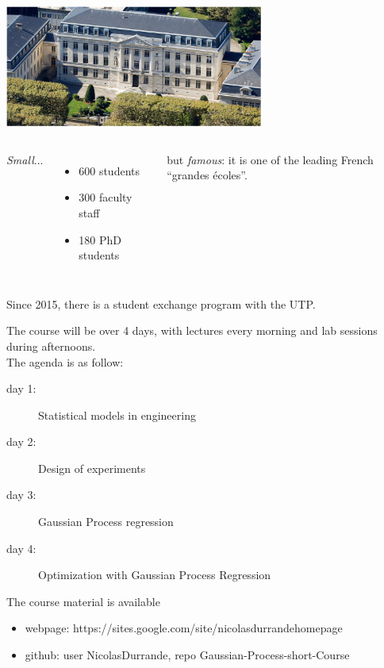 \documentclass{beamer}
\begin{document}
\begin{frame}{}
\begin{center}
\includegraphics[height=4cm]{figures/Mines}
\end{center}
\begin{columns}[t]
\column{5cm}
\emph{Small}...
\begin{itemize}
	\item 600 students
	\item 300 faculty staff
	\item 180 PhD students 
\end{itemize}
\column{5cm}
but \emph{famous}: it is one of the leading French ``grandes écoles''.\\
\end{columns}
\vspace{5mm}
Since 2015, there is a student exchange program with the UTP.
\end{frame}

\begin{frame}{}
The course will be over 4 days, with lectures every morning and lab sessions during afternoons. \\ \vspace{5mm}
The agenda is as follow:
\vspace{0.2cm}
\begin{description}
	\item[day 1:] Statistical models in engineering
	\item[day 2:] Design of experiments
	\item[day 3:] Gaussian Process regression
	\item[day 4:] Optimization  with Gaussian Process Regression
\end{description}
\vspace{5mm}
The course material is available
\begin{itemize}
	\item[] webpage: {\small https://sites.google.com/site/nicolasdurrandehomepage}
	\item[] github: {\small user NicolasDurrande, repo Gaussian-Process-short-Course}
\end{itemize}

\end{frame}
\end{document}
